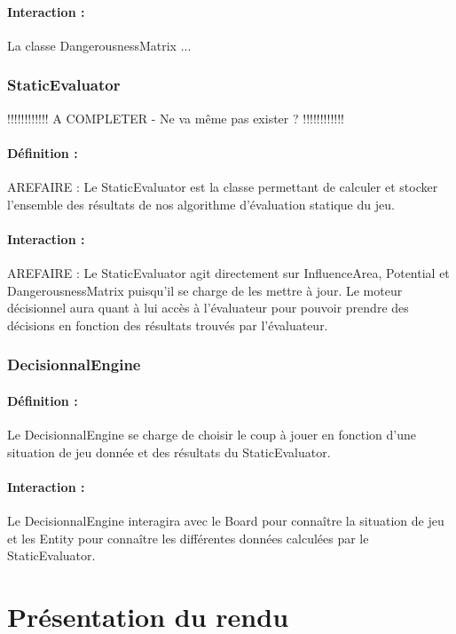 \documentclass[12pt]{article}
\begin{document}
				\paragraph{Interaction :}
				La classe DangerousnessMatrix ...

			\subsubsection{StaticEvaluator}

				!!!!!!!!!!!! A COMPLETER - Ne va même pas exister ? !!!!!!!!!!!!
				\paragraph{Définition :}
				AREFAIRE : Le StaticEvaluator est la classe permettant de calculer et stocker l'ensemble des résultats de nos algorithme 
				d'évaluation statique du jeu.
				\paragraph{Interaction :}
				AREFAIRE : Le StaticEvaluator agit directement sur InfluenceArea, Potential et DangerousnessMatrix puisqu'il se charge 
				de les mettre à jour. Le moteur décisionnel aura quant à lui accès à l'évaluateur pour pouvoir prendre des décisions en fonction 
				des résultats trouvés par l'évaluateur.

			\subsubsection{DecisionnalEngine}

				\paragraph{Définition :}
				Le DecisionnalEngine se charge de choisir le coup à jouer en fonction d'une situation de jeu donnée et des résultats 
				du StaticEvaluator.
				\paragraph{Interaction :}
				Le DecisionnalEngine interagira avec le Board pour connaître la situation de jeu et les Entity pour connaître les 
				différentes données calculées par le StaticEvaluator.

		\clearpage
		
	\section{Présentation du rendu}    
\end{document}
